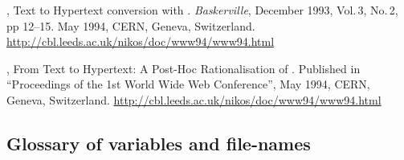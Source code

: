 \documentclass[dvips,a4paper]{article}
\begin{document}
\begin{thebibliography}{1}
\NikosDrakos,
\newblock Text to Hypertext conversion with \latextohtml.
\newblock \textit{Baskerville}, December 1993, Vol.\,3, No.\,2, pp 12--15.
\newblock May 1994, CERN, Geneva, Switzerland.
\newblock \url{http://cbl.leeds.ac.uk/nikos/doc/www94/www94.html}

\NikosDrakos,
\newblock From Text to Hypertext: A Post-Hoc Rationalisation of \latextohtml.
\newblock Published in ``Proceedings of the 1st World Wide Web Conference'',
\newblock May 1994, CERN, Geneva, Switzerland.
\newblock \url{http://cbl.leeds.ac.uk/nikos/doc/www94/www94.html}

\end{thebibliography}


%
%
%
%
\begin{latexonly}
%
{}
\end{latexonly}

\begin{htmlonly}
\section{Glossary of variables and file-names\label{Glossary}}
\begin{htmllist}
\end{htmllist}
\end{htmlonly}

%
%
%
%
%
\printindex
\end{document}
